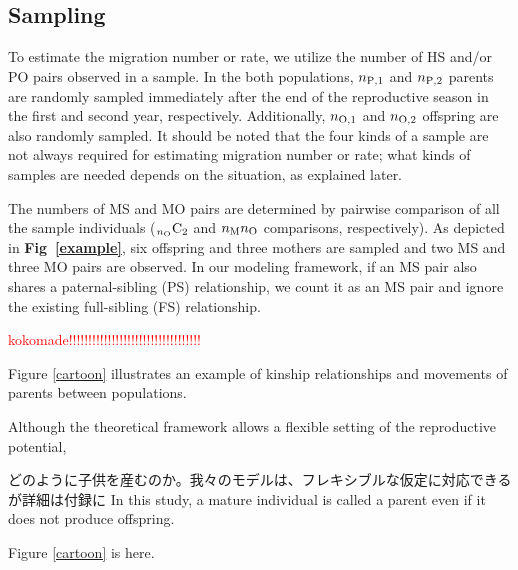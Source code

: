 \documentclass[12pt, English]{article}
\begin{document}
\begin{spacing}{1.9}
\subsection{Sampling}

To estimate the migration number or rate, we utilize the number of HS and/or PO pairs observed in a sample. In the both populations, $n_{\rm P, 1}$ and $n_{\rm P, 2}$ parents are randomly sampled immediately after the end of the reproductive season in the first and second year, respectively. Additionally, $n_{\rm O, 1}$ and $n_{\rm O, 2}$ offspring are also randomly sampled. It should be noted that the four kinds of a sample are not always required for estimating migration number or rate; what kinds of samples are needed depends on the situation, as explained later. 


 The numbers of MS and MO pairs are determined by pairwise comparison of all the sample individuals (${}_{n_{\rm O}}\mathrm{C}_2$ and $n_{\rm M}n_{\rm O}$ comparisons, respectively). As depicted in {\bf Fig~\ref{example}}, six offspring and three mothers are sampled and two MS and three MO pairs are observed. In our modeling framework, if an MS pair also shares a paternal-sibling (PS) relationship, we count it as an MS pair and ignore the existing full-sibling (FS) relationship. 

\textcolor{red}{kokomade!!!!!!!!!!!!!!!!!!!!!!!!!!!!!!!!!!}


Figure \ref{cartoon} illustrates an example of kinship relationships and movements of parents between populations. 




Although the theoretical framework allows a flexible setting of the reproductive potential, 





どのように子供を産むのか。我々のモデルは、フレキシブルな仮定に対応できるが詳細は付録に
In this study, a mature individual is called a parent even if it does not produce offspring. 



\begin{center}
Figure \ref{cartoon} is here. 
\end{center}





\end{spacing}
\end{document}

